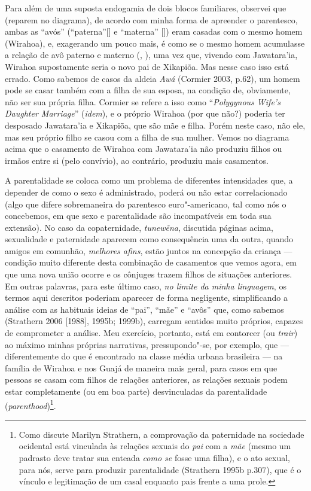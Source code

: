 Para além de uma suposta endogamia de dois blocos familiares, observei
que (reparem no diagrama), de acordo com minha forma de apreender o
parentesco, ambas as ``avós'' (``paterna''[] e ``materna''
[]) eram casadas com o mesmo homem (Wirahoa), e, exagerando um
pouco mais, é como se o mesmo homem acumulasse a relação de avô paterno
e materno (, ), uma vez que, vivendo com Jawatara'ia, Wirahoa
supostamente seria o novo pai de Xikapiõa. Mas nesse caso isso está
errado. Como sabemos de casos da aldeia \emph{Awá} (Cormier 2003, p.62),
um homem pode se casar também com a filha de sua esposa, na condição de,
obviamente, não ser sua própria filha. Cormier se refere a isso como
``\emph{Polygynous Wife's Daughter Marriage}'' (\emph{idem}), e o próprio
Wirahoa (por que não?) poderia ter desposado Jawatara'ia e Xikapiõa, que
são mãe e filha. Porém neste caso, não ele, mas seu próprio filho se
casou com a filha de sua mulher. Vemos no diagrama acima que o casamento
de Wirahoa com Jawatara'ia não produziu filhos ou irmãos entre si (pelo
convívio), ao contrário, produziu mais casamentos.

A parentalidade se coloca como um problema de diferentes intensidades
que, a depender de como o sexo é administrado, poderá ou não estar
correlacionado (algo que difere sobremaneira do parentesco
euro"-americano, tal como nós o concebemos, em que sexo e parentalidade
são incompatíveis em toda sua extensão). No caso da copaternidade,
\emph{tunewẽna}, discutida páginas acima, sexualidade e paternidade
aparecem como consequência uma da outra, quando amigos em comunhão,
\emph{melhores afins}, estão juntos na concepção da criança --- condição
muito diferente desta combinação de casamentos que vemos agora, em que
uma nova união ocorre e os cônjuges trazem filhos de situações
anteriores. Em outras palavras, para este último caso, \emph{no limite
da minha linguagem}, os termos aqui descritos poderiam aparecer de forma
negligente, simplificando a análise com as habituais ideias de ``pai'',
``mãe'' e ``avôs'' que, como sabemos (Strathern 2006 {[}1988{]}, 1995b;
1999b), carregam sentidos muito próprios, capazes de comprometer a
análise. Meu exercício, portanto, está em contorcer (ou \emph{trair}) ao
máximo minhas próprias narrativas, pressupondo"-se, por exemplo, que ---
diferentemente do que é encontrado na classe média urbana brasileira ---
na família de Wirahoa e nos Guajá de maneira mais geral, para casos em
que pessoas se casam com filhos de relações anteriores, as relações
sexuais podem estar completamente (ou em boa parte) desvinculadas da
parentalidade (\emph{parenthood})\footnote{Como discute Marilyn
  Strathern, a comprovação da paternidade na sociedade ocidental está
  vinculada às relações sexuais do \emph{pai} com a \emph{mãe} (mesmo um
  padrasto deve tratar sua enteada \emph{como se} fosse uma filha), e o
  ato sexual, para nós, serve para produzir parentalidade (Strathern
  1995b p.307), que é o vínculo e legitimação de um casal enquanto pais
  frente a uma prole.}.

